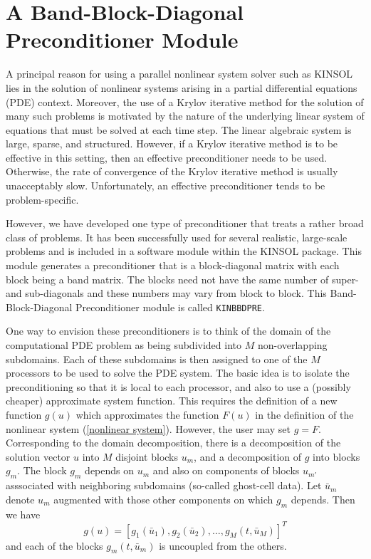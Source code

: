 \section{A Band-Block-Diagonal Preconditioner Module}

A principal reason for using a parallel nonlinear system solver such as 
KINSOL lies in the solution of nonlinear systems arising in a partial 
differential equations (PDE) context.  Moreover,
the use of a Krylov iterative method for the solution of many such
problems is motivated by the nature of the underlying linear system of
equations that must be solved at each time step.  The
linear algebraic system is large, sparse, and structured. However, if
a Krylov iterative method is to be effective in this setting, then an
effective preconditioner needs to be used.  Otherwise, the rate of
convergence of the Krylov iterative method is usually unacceptably
slow.  Unfortunately, an effective preconditioner tends to be
problem-specific.

However, we have developed one type of preconditioner that treats a
rather broad class of problems.  It has been successfully
used for several realistic, large-scale problems and is
included in a software module within the KINSOL package. This module
generates a preconditioner that is a block-diagonal matrix with each
block being a band matrix. The blocks need not have the same number of
super- and sub-diagonals and these numbers may vary from block to
block. This Band-Block-Diagonal Preconditioner module is called
{\tt KINBBDPRE}.

One way to envision these preconditioners is to think of the domain of
the computational PDE problem as being subdivided into $M$ non-overlapping
subdomains.  Each of these subdomains is then assigned to one of the
$M$ processors to be used to solve the PDE system. The basic idea is
to isolate the preconditioning so that it is local to each processor,
and also to use a (possibly cheaper) approximate system
function. This requires the definition of a new function $g(u)$
which approximates the function $F(u)$ in the definition of the nonlinear
system (\ref{nonlinear system}). However, the user may set $g = F$.  
Corresponding to the domain decomposition, there is a decomposition of the 
solution vector $u$ into $M$ disjoint blocks $u_m$, and a decomposition of $g$
into blocks $g_m$.  The block $g_m$ depends on $u_m$ and also on
components of blocks $u_{m'}$ asssociated with neighboring subdomains
(so-called ghost-cell data).  Let $\bar{u}_m$ denote $u_m$ augmented
with those other components on which $g_m$ depends.  Then we have
\begin{equation}
g(u) = [g_1(\bar{u}_1), g_2(\bar{u}_2), \ldots, g_M(t,\bar{u}_M)]^T
\end{equation}
and each of the blocks $g_m(t, \bar{u}_m)$ is uncoupled from the others.

